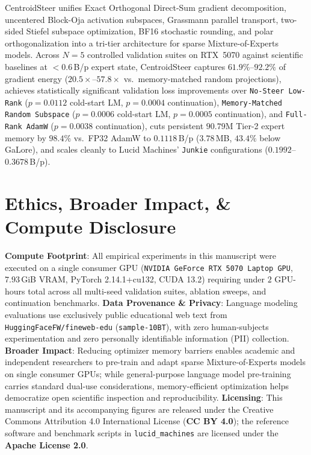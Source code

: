 \documentclass[10pt,twocolumn,letterpaper]{article}
\begin{document}
CentroidSteer unifies Exact Orthogonal Direct-Sum gradient decomposition, uncentered Block-Oja activation subspaces, Grassmann parallel transport, two-sided Stiefel subspace optimization, BF16 stochastic rounding, and polar orthogonalization into a tri-tier architecture for sparse Mixture-of-Experts models. Across $N=5$ controlled validation suites on RTX~5070 against scientific baselines at $<0.6$\,B/p expert state, CentroidSteer captures $61.9\%$--$92.2\%$ of gradient energy ($20.5\times$--$57.8\times$ vs.\ memory-matched random projections), achieves statistically significant validation loss improvements over \texttt{No-Steer Low-Rank} ($p=0.0112$ cold-start LM, $p=0.0004$ continuation), \texttt{Memory-Matched Random Subspace} ($p=0.0006$ cold-start LM, $p=0.0005$ continuation), and \texttt{Full-Rank AdamW} ($p=0.0038$ continuation), cuts persistent $90.79\text{M}$ Tier-2 expert memory by $98.4\%$ vs.\ FP32 AdamW to $0.1118$\,B/p ($3.78$\,MB, $43.4\%$ below GaLore), and scales cleanly to Lucid Machines' \texttt{Junkie} configurations ($0.1992$--$0.3678$\,B/p).

\section*{Ethics, Broader Impact, \& Compute Disclosure}

\textbf{Compute Footprint}: All empirical experiments in this manuscript were executed on a single consumer GPU (\texttt{NVIDIA GeForce RTX 5070 Laptop GPU}, $7.93$\,GiB VRAM, PyTorch 2.14.1+cu132, CUDA 13.2) requiring under $2$ GPU-hours total across all multi-seed validation suites, ablation sweeps, and continuation benchmarks.
\textbf{Data Provenance \& Privacy}: Language modeling evaluations use exclusively public educational web text from \texttt{HuggingFaceFW/fineweb-edu} (\texttt{sample-10BT}), with zero human-subjects experimentation and zero personally identifiable information (PII) collection.
\textbf{Broader Impact}: Reducing optimizer memory barriers enables academic and independent researchers to pre-train and adapt sparse Mixture-of-Experts models on single consumer GPUs; while general-purpose language model pre-training carries standard dual-use considerations, memory-efficient optimization helps democratize open scientific inspection and reproducibility.
\textbf{Licensing}: This manuscript and its accompanying figures are released under the Creative Commons Attribution 4.0 International License (\textbf{CC BY 4.0}); the reference software and benchmark scripts in \texttt{lucid\_machines} are licensed under the \textbf{Apache License 2.0}.



\end{document}
